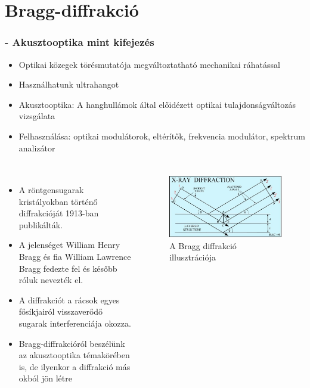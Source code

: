 \documentclass[aspectratio=169]{beamer}
\begin{document}
\section{Bragg-diffrakció}
\begin{frame}
\frametitle{\secname{} - Akusztooptika mint kifejezés}
\begin{itemize}
\item Optikai közegek törésmutatója megváltoztatható mechanikai ráhatással
\item Használhatunk ultrahangot
\item Akusztooptika: A hanghullámok által előidézett optikai tulajdonságváltozás vizsgálata
\item Felhasználása: optikai modulátorok, eltérítők, frekvencia modulátor, spektrum analizátor
\end{itemize}
\end{frame}
\begin{frame}
\frametitle{\secname}
\begin{columns}
\begin{itemize}
\item A röntgensugarak kristályokban történő diffrakcióját 1913-ban publikálták.
\item A jelenséget William Henry Bragg és fia William Lawrence Bragg fedezte fel és később róluk nevezték el.
\item A diffrakciót a rácsok egyes fősíkjairól visszaverődő sugarak interferenciája okozza.
\item Bragg-diffrakcióról beszélünk az akusztooptika témakörében is, de ilyenkor a diffrakció más okból jön létre
\end{itemize}
\begin{figure}
\includegraphics[width=.9\textwidth]{xrd6.jpg}
\caption{A Bragg diffrakció illusztrációja}
\end{figure}
\end{columns}
\end{frame}
\end{document}
